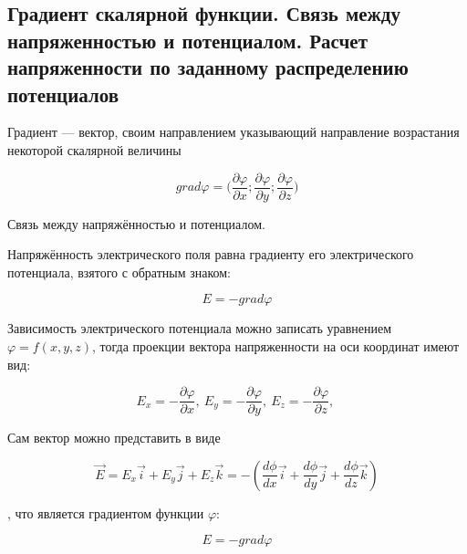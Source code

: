 \subsection{Градиент скалярной функции. Связь между напряженностью и потенциалом. Расчет напряженности по заданному распределению потенциалов}

\begin{definition}
    Градиент — вектор, своим направлением указывающий направление возрастания некоторой скалярной величины

    $$grad\varphi=\big(\frac{\partial\varphi}{\partial x};\frac{\partial\varphi}{\partial y};\frac{\partial\varphi}{\partial z}\big)$$

\end{definition}

\begin{definition}
    Связь между напряжённостью и потенциалом.

    Напряжённость электрического поля равна градиенту его электрического потенциала, взятого с обратным знаком:

    $$E=-grad\varphi$$
\end{definition}

Зависимость электрического потенциала можно записать уравнением $\varphi=f(x,y,z)$, 
тогда проекции вектора напряженности на оси координат имеют вид:

$$E_x=-\frac{\partial\varphi}{\partial x},\ E_y=-\frac{\partial\varphi}{\partial y},\ E_z=-\frac{\partial\varphi}{\partial z},\ $$

Сам  вектор можно представить в виде

$$\vec{E} = E_x \vec{i} + E_y \vec{j} + E_z \vec{k} = -\left( \frac{d\phi}{dx}\vec{i} + \frac{d\phi}{dy}\vec{j} + \frac{d\phi}{dz}\vec{k}\right)$$

, что является градиентом функции $\varphi$:

$$E=-grad\varphi$$
